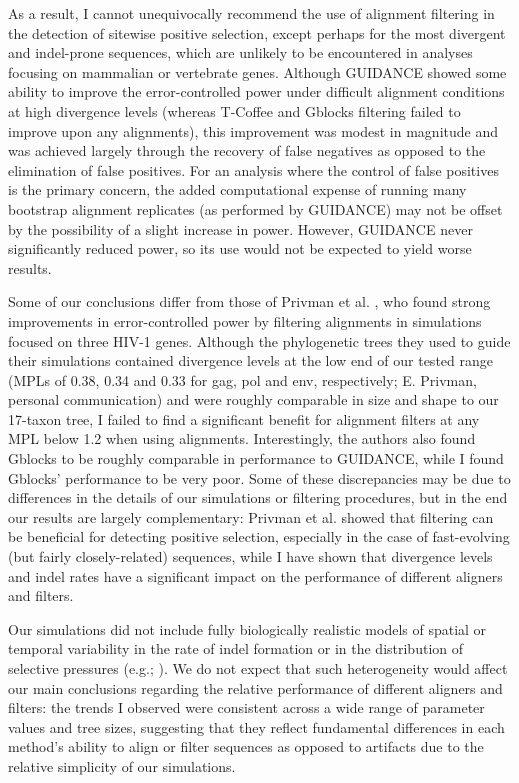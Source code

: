As a result, I cannot unequivocally recommend the use of alignment
filtering in the detection of sitewise positive selection, except
perhaps for the most divergent and indel-prone sequences, which are
unlikely to be encountered in analyses focusing on mammalian or
vertebrate genes. Although GUIDANCE showed some ability to improve the
error-controlled power under difficult alignment conditions at high
divergence levels (whereas T-Coffee and Gblocks filtering failed to improve upon
any \prankc alignments), this improvement was modest in magnitude and
was achieved largely through the recovery of false negatives as
opposed to the elimination of false positives. For an analysis where
the control of false positives is the primary concern, the added
computational expense of running many bootstrap alignment replicates
(as performed by GUIDANCE) may not be offset by the possibility of a
slight increase in power. However, GUIDANCE never significantly
reduced power, so its use would not be expected to yield worse
results.

Some of our conclusions differ from those of Privman et
al. \citeyearpar{Privman2011Improving}, who found strong improvements
in error-controlled power by filtering alignments in simulations
focused on three HIV-1 genes. Although the phylogenetic trees they
used to guide their simulations contained divergence levels at the low
end of our tested range (MPLs of 0.38, 0.34 and 0.33 for gag, pol and
env, respectively; E. Privman, personal communication) and were
roughly comparable in size and shape to our 17-taxon tree, I failed
to find a significant benefit for alignment filters at any MPL below
1.2 when using \prankc alignments. Interestingly, the authors also
found Gblocks to be roughly comparable in performance to GUIDANCE,
while I found Gblocks' performance to be very poor. Some of these
discrepancies may be due to differences in the details of our
simulations or filtering procedures, but in the end our results are
largely complementary: Privman et al. showed that filtering can be
beneficial for detecting positive selection, especially in the case of
fast-evolving (but fairly closely-related) sequences, while I have
shown that divergence levels and indel rates have a significant impact
on the performance of different aligners and filters.

Our simulations did not include fully biologically realistic models of
spatial or temporal variability in the rate of indel formation or in
the distribution of selective pressures (e.g.; \citealt{Whelan2008Spatial}). We
do not expect that such heterogeneity would affect our main
conclusions regarding the relative performance of different aligners
and filters: the trends I observed were consistent across a wide
range of parameter values and tree sizes, suggesting that they reflect
fundamental differences in each method's ability to align or filter
sequences as opposed to artifacts due to the relative simplicity of
our simulations.

